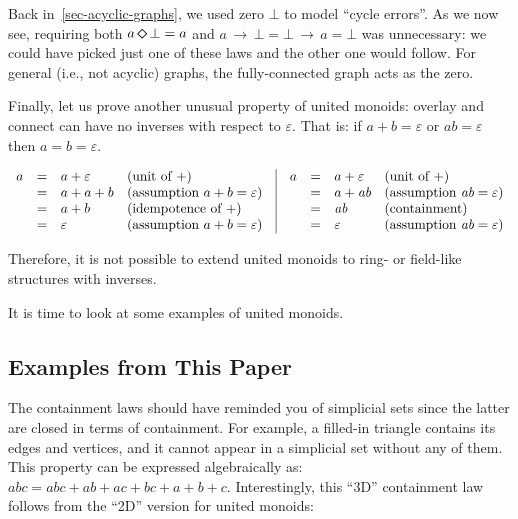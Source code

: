 \documentclass[crc,english]{programming}
\newcommand{\dia}{\,\text{\raisebox{-0.3mm}{\Large $\diamond$}}\,}
\newcommand{\arr}{\,\text{$\rightarrow$}\,}
\begin{document}
\noindent
Back in~\ref{sec-acyclic-graphs}, we used zero $\bot$ to model ``cycle errors''.
As we now see, requiring both $a \dia \bot = a$ and
$a \arr \bot = \bot \arr a = \bot$ was unnecessary: we could have picked just
one of these laws and the other one would follow.
For general (i.e., not acyclic) graphs, the fully-connected graph acts as the
zero.

\noindent
Finally, let us prove another unusual property of united monoids: overlay and
connect can have no inverses with respect to $\varepsilon$. That is: if
$a + b = \varepsilon$ or $\textit{ab} = \varepsilon$ then $a = b = \varepsilon$.

\vspace{-5mm}
\begin{equation*}
\begin{array}{rcllcrcll}
a & = & a + \varepsilon & \text{(unit of $+$)} & \vrule & a & = & a + \varepsilon & \text{(unit of $+$)}\\
 & = & a + a + b & \text{(assumption $a + b = \varepsilon$)}& \vrule &  & = & a + \textit{ab} & \text{(assumption $\textit{ab} = \varepsilon$)} \\
 & = & a + b & \text{(idempotence of $+$)}& \vrule & & = & \textit{ab} & \text{(containment)} \\
 & = & \varepsilon & \text{(assumption $a + b = \varepsilon$)}& \vrule & & = & \varepsilon & \text{(assumption $\textit{ab} = \varepsilon$)}
\end{array}
\end{equation*}
\vspace{-3mm}

\noindent
Therefore, it is not possible to extend united monoids to ring- or field-like
structures with inverses.

It is time to look at some examples of united monoids.

\subsection{Examples from This Paper}

The containment laws should have reminded you of simplicial sets since the
latter are closed in terms of containment. For example, a filled-in triangle
contains its edges and vertices, and it cannot appear in a simplicial set
without any of them. This property can be expressed algebraically as:
$\textit{abc} = \textit{abc} + \textit{ab} + \textit{ac} + \textit{bc} + a + b + c$.
Interestingly, this ``3D'' containment law follows from the ``2D'' version for
united monoids:
\end{document}
